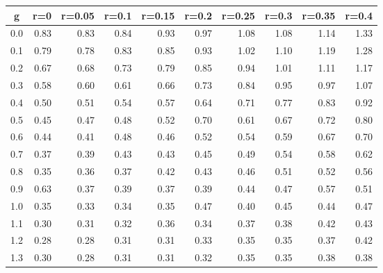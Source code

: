 %
\begin{table}[!tbp]
 \begin{center}
 \begin{tabular}{rrrrrrrrrr}\hline\hline
\multicolumn{1}{c}{g}&\multicolumn{1}{c}{r=0}&\multicolumn{1}{c}{r=0.05}&\multicolumn{1}{c}{r=0.1}&\multicolumn{1}{c}{r=0.15}&\multicolumn{1}{c}{r=0.2}&\multicolumn{1}{c}{r=0.25}&\multicolumn{1}{c}{r=0.3}&\multicolumn{1}{c}{r=0.35}&\multicolumn{1}{c}{r=0.4}\tabularnewline
\hline
0.0&0.83&0.83&0.84&0.93&0.97&1.08&1.08&1.14&1.33\tabularnewline
0.1&0.79&0.78&0.83&0.85&0.93&1.02&1.10&1.19&1.28\tabularnewline
0.2&0.67&0.68&0.73&0.79&0.85&0.94&1.01&1.11&1.17\tabularnewline
0.3&0.58&0.60&0.61&0.66&0.73&0.84&0.95&0.97&1.07\tabularnewline
0.4&0.50&0.51&0.54&0.57&0.64&0.71&0.77&0.83&0.92\tabularnewline
0.5&0.45&0.47&0.48&0.52&0.70&0.61&0.67&0.72&0.80\tabularnewline
0.6&0.44&0.41&0.48&0.46&0.52&0.54&0.59&0.67&0.70\tabularnewline
0.7&0.37&0.39&0.43&0.43&0.45&0.49&0.54&0.58&0.62\tabularnewline
0.8&0.35&0.36&0.37&0.42&0.43&0.46&0.51&0.52&0.56\tabularnewline
0.9&0.63&0.37&0.39&0.37&0.39&0.44&0.47&0.57&0.51\tabularnewline
1.0&0.35&0.33&0.34&0.35&0.47&0.40&0.45&0.44&0.47\tabularnewline
1.1&0.30&0.31&0.32&0.36&0.34&0.37&0.38&0.42&0.43\tabularnewline
1.2&0.28&0.28&0.31&0.31&0.33&0.35&0.35&0.37&0.42\tabularnewline
1.3&0.30&0.28&0.31&0.31&0.32&0.35&0.35&0.38&0.38\tabularnewline
\hline
\end{tabular}

\end{center}

\end{table}

